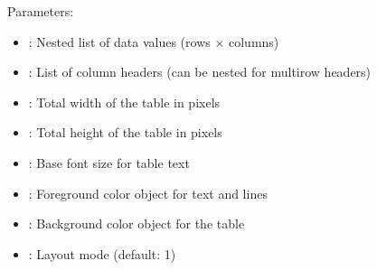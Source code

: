 \documentclass[letterpaper,10pt,english]{sphinxmanual}
\begin{document}
\sphinxAtStartPar
Parameters:
\begin{itemize}
\item {} 
\sphinxAtStartPar
{}: Nested list of data values (rows × columns)

\item {} 
\sphinxAtStartPar
{}: List of column headers (can be nested for multi\sphinxhyphen{}row headers)

\item {} 
\sphinxAtStartPar
{}: Total width of the table in pixels

\item {} 
\sphinxAtStartPar
{}: Total height of the table in pixels

\item {} 
\sphinxAtStartPar
{}: Base font size for table text

\item {} 
\sphinxAtStartPar
{}: Foreground color object for text and lines

\item {} 
\sphinxAtStartPar
{}: Background color object for the table

\item {} 
\sphinxAtStartPar
{}: Layout mode (default: 1)

\end{itemize}

\sphinxAtStartPar
{}

\begin{sphinxVerbatim}[commandchars=\\\{\}]
\end{sphinxVerbatim}

\sphinxAtStartPar
{}
\end{document}
